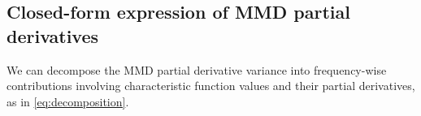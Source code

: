 \documentclass{article}
\theoremstyle{plain}
\newtheorem{theorem}{Theorem}[section]
\theoremstyle{definition}
\newtheorem{assumption}[theorem]{Assumption}
\theoremstyle{remark}
\begin{document}
\subsection{Closed-form expression of MMD partial derivatives}
\label{subsec:mmd}
We can decompose the MMD partial derivative variance into frequency-wise contributions involving characteristic function values and their partial derivatives, as in \cref{eq:decomposition}.
\end{document}
